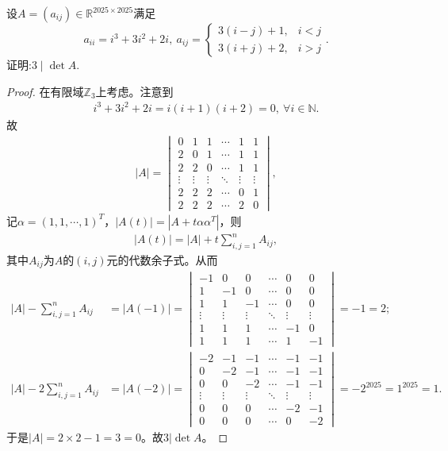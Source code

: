 \documentclass[../../main.tex]{subfiles}
\begin{document}
\begin{example}
设$A = (a_{ij}) \in \mathbb{R}^{2025 \times 2025}$满足
\[
a_{ii} = i^3 + 3i^2 + 2i, \ a_{ij} = \begin{cases}
3(i - j) + 1, & i < j \\
3(i + j) + 2, & i > j
\end{cases}.
\]
证明:$3 \mid \det A$.
\end{example}
\begin{proof}
在有限域$\mathbb{Z}_3$上考虑。注意到
\begin{align*}
i^3+3i^2+2i=i(i+1)(i+2)=0,\ \forall i\in\mathbb{N}.
\end{align*}
故
\begin{align*}
|A|=\begin{vmatrix}
0&1&1&\cdots&1&1\\
2&0&1&\cdots&1&1\\
2&2&0&\cdots&1&1\\
\vdots&\vdots&\vdots&\ddots&\vdots&\vdots\\
2&2&2&\cdots&0&1\\
2&2&2&\cdots&2&0
\end{vmatrix},
\end{align*}
记$\alpha=(1,1,\cdots,1)^T$，$|A(t)|=|A+t\alpha\alpha^T|$，则
\begin{align*}
|A(t)|=|A|+t\sum_{i,j=1}^n A_{ij},
\end{align*}
其中$A_{ij}$为$A$的$(i,j)$元的代数余子式。从而
\begin{align*}
|A|-\sum_{i,j=1}^n A_{ij}&=|A(-1)|=\begin{vmatrix}
-1&0&0&\cdots&0&0\\
1&-1&0&\cdots&0&0\\
1&1&-1&\cdots&0&0\\
\vdots&\vdots&\vdots&\ddots&\vdots&\vdots\\
1&1&1&\cdots&-1&0\\
1&1&1&\cdots&1&-1
\end{vmatrix}=-1=2;\\
|A|-2\sum_{i,j=1}^n A_{ij}&=|A(-2)|=\begin{vmatrix}
-2&-1&-1&\cdots&-1&-1\\
0&-2&-1&\cdots&-1&-1\\
0&0&-2&\cdots&-1&-1\\
\vdots&\vdots&\vdots&\ddots&\vdots&\vdots\\
0&0&0&\cdots&-2&-1\\
0&0&0&\cdots&0&-2
\end{vmatrix}=-2^{2025}=1^{2025}=1.
\end{align*}
于是$|A|=2\times 2-1=3=0$。故$3|\det A$。


\end{proof}
\end{document}
